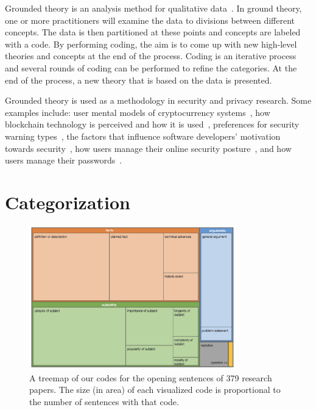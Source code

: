 \documentclass[sigconf,anonymous]{acmart}
\begin{document}
Grounded theory is an analysis method for qualitative data~\cite{glaser1968discovery}. In ground theory, one or more practitioners will examine the data to divisions between different concepts. The data is then partitioned at these points and concepts are labeled with a code. By performing coding, the aim is to come up with new high-level theories and concepts at the end of the process. Coding is an iterative process and several rounds of coding can be performed to refine the categories. At the end of the process, a new theory that is based on the data is presented.

Grounded theory is used as a methodology in security and privacy research. Some examples include: user mental models of cryptocurrency systems~\cite{mai2020user}, how blockchain technology is perceived and how it is used~\cite{ruoti2019blockchain}, preferences for security warning types~\cite{danilova2020one}, the factors that influence software developers' motivation towards security~\cite{assal2018motivations},  how users manage their online security posture~\cite{ruoti2017weighing}, and how users manage their passwords~\cite{stobert2014password}.
	
\section{Categorization}
	
\label{sec:categories}
\begin{figure}[t]
	\centering
	\includegraphics[width=0.8\textwidth]{image.png}
	\caption{A treemap of our codes for the opening sentences of 379 research papers. The size (in area) of each visualized code is proportional to the number of sentences with that code.}
	\label{fig:treemap}
\end{figure}
	
	
	
\end{document}
